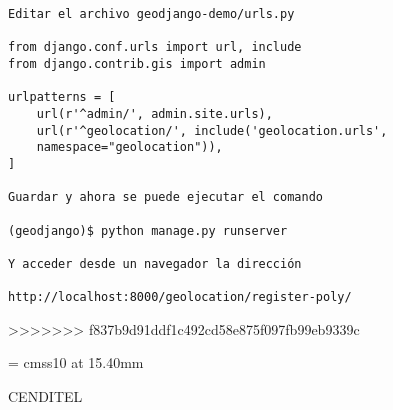 \documentclass[xcolor=dvipsnames]{beamer}
\begin{document}
\begin{frame}[fragile]
\begin{verbatim}
Editar el archivo geodjango-demo/urls.py

from django.conf.urls import url, include
from django.contrib.gis import admin

urlpatterns = [
    url(r'^admin/', admin.site.urls),
    url(r'^geolocation/', include('geolocation.urls', 
    namespace="geolocation")),
]

Guardar y ahora se puede ejecutar el comando 

(geodjango)$ python manage.py runserver

Y acceder desde un navegador la dirección 

http://localhost:8000/geolocation/register-poly/
\end{verbatim}
\end{frame}


>>>>>>> f837b9d91ddf1c492cd58e875f097fb99eb9339c
\begin{frame}[plain]

  
      \begin{center}

        \font\endfont = cmss10 at 15.40mm
        \color{Brown}
        \endfont 
        \baselineskip 20.0mm

        CENDITEL

      \end{center}    

    
\end{frame}
\end{document}
